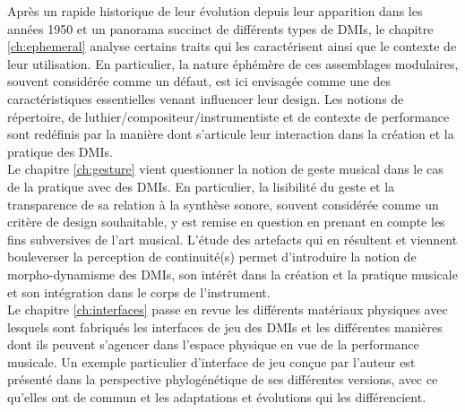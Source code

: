 \noindent Après un rapide historique de leur évolution depuis leur apparition dans les années 1950 et un panorama succinct de différents types de \glspl{DMI}, le chapitre \ref{ch:ephemeral} analyse certains traits qui les caractérisent ainsi que le contexte de leur utilisation. En particulier, la nature éphémère de ces assemblages modulaires, souvent considérée comme un défaut, est ici envisagée comme une des caractéristiques essentielles venant influencer leur design. Les notions de répertoire, de luthier/compositeur/instrumentiste et de contexte de performance sont redéfinis par la manière dont s'articule leur interaction dans la création et la pratique des \glspl{DMI}.\\
\indent Le chapitre \ref{ch:gesture} vient questionner la notion de geste musical dans le cas de la pratique avec des \glspl{DMI}. En particulier, la lisibilité du geste et la transparence de sa relation à la synthèse sonore, souvent considérée comme un critère de design souhaitable, y est remise en question en prenant en compte les fins subversives de l'art musical. L'étude des artefacts qui en résultent et viennent bouleverser la perception de continuité(s) permet d'introduire la notion de morpho-dynamisme des \glspl{DMI}, son intérêt dans la création et la pratique musicale et son intégration dans le corps de l'instrument.\\
\indent Le chapitre \ref{ch:interfaces} passe en revue les différents matériaux physiques avec lesquels sont fabriqués les interfaces de jeu des \glspl{DMI} et les différentes manières dont ils peuvent s'agencer dans l'espace physique en vue de la performance musicale. Un exemple particulier d'interface de jeu conçue par l'auteur est présenté dans la perspective phylogénétique de ses différentes versions, avec ce qu'elles ont de commun et les adaptations et évolutions qui les différencient.\\
